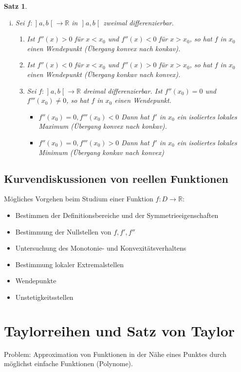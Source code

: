 \documentclass[ngerman,titlepage,twoside, parskip=half*]{scrreprt}
\newcommand*{\R}{\mathbb{R}}
\theoremstyle{break}
\newtheorem{theorem}{Satz}[section]
\theoremstyle{nonumberbreak}
\newtheorem{proof}{Beweis:}
\newcommand*{\bsofint}[1]{\mathopen{]}#1\mathclose{[}} %
\begin{document}
\begin{theorem}
\begin{enumerate}[(i)]
\begin{proof}
      zeigen.
    \end{proof}
  \item Sei $f\colon\bsofint{a,b}\rightarrow\R$ in $\bsofint{a,b}$
    zweimal differenzierbar.
    \begin{enumerate}[(1)]
    \item Ist $f''(x)>0$ für $x<x_0$ und $f''(x)<0$ für $x>x_0$, so
      hat $f$ in $x_0$ einen Wendepunkt (Übergang konvex nach konkav).
    \item Ist $f''(x)<0$ für $x<x_0$ und $f''(x)>0$ für $x>x_0$, so
      hat $f$ in  $x_0$ einen Wendepunkt (Übergang konkav nach konvex).
    \item Sei $f\colon\bsofint{a,b}\rightarrow\R$ dreimal
      differenzierbar. Ist $f''(x_0)=0$ und $f'''(x_0)\neq 0$, so
      hat $f$ in $x_0$ einen Wendepunkt.
      \begin{itemize}
      \item $f''(x_0)=0, f'''(x_0)<0$ Dann hat $f'$ in $x_0$ ein
        isoliertes lokales Maximum (Übergang konvex nach konkav).
      \item $f''(x_0)=0, f'''(x_0)>0$ Dann hat $f'$ in $x_0$ ein
        isoliertes lokales Minimum (Übergang konkav nach konvex)
      \end{itemize}
    \end{enumerate}
  \end{enumerate}
\end{theorem}

\subsection{Kurvendiskussionen von reellen Funktionen}
Mögliches Vorgehen beim Studium einer Funktion $f\colon D\rightarrow\R$:
\begin{itemize}
\item Bestimmen der Definitionsbereiche und der Symmetrieeigenschaften
\item Bestimmung der Nullstellen von $f, f', f''$
\item Untersuchung des Monotonie- und Konvexitätsverhaltens
\item Bestimmung lokaler Extremalstellen
\item Wendepunkte
\item Unstetigkeitsstellen
\end{itemize}

\section{Taylorreihen und Satz von Taylor}
Problem: Approximation von Funktionen in der Nähe eines Punktes durch
möglichst einfache Funktionen (Polynome).
\end{document}
